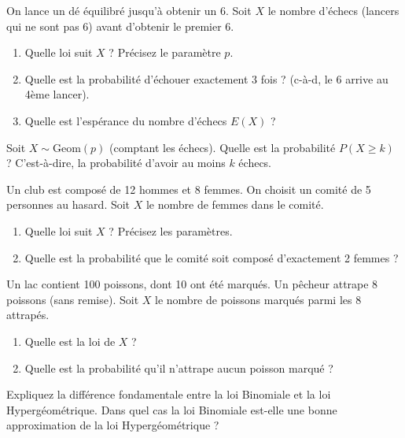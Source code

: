 
\begin{exercicebox}
On lance un dé équilibré jusqu'à obtenir un 6. Soit $X$ le nombre d'échecs (lancers qui ne sont pas 6) avant d'obtenir le premier 6.
\begin{enumerate}
    \item Quelle loi suit $X$ ? Précisez le paramètre $p$.
    \item Quelle est la probabilité d'échouer exactement 3 fois ? (c-à-d, le 6 arrive au 4ème lancer).
    \item Quelle est l'espérance du nombre d'échecs $E(X)$ ?
\end{enumerate}
\end{exercicebox}

\begin{exercicebox}
Soit $X \sim \text{Geom}(p)$ (comptant les échecs).
Quelle est la probabilité $P(X \ge k)$ ? C'est-à-dire, la probabilité d'avoir au moins $k$ échecs.
\end{exercicebox}

\begin{exercicebox}
Un club est composé de 12 hommes et 8 femmes. On choisit un comité de 5 personnes au hasard. Soit $X$ le nombre de femmes dans le comité.
\begin{enumerate}
    \item Quelle loi suit $X$ ? Précisez les paramètres.
    \item Quelle est la probabilité que le comité soit composé d'exactement 2 femmes ?
\end{enumerate}
\end{exercicebox}

\begin{exercicebox}
Un lac contient 100 poissons, dont 10 ont été marqués. Un pêcheur attrape 8 poissons (sans remise). Soit $X$ le nombre de poissons marqués parmi les 8 attrapés.
\begin{enumerate}
    \item Quelle est la loi de $X$ ?
    \item Quelle est la probabilité qu'il n'attrape aucun poisson marqué ?
\end{enumerate}
\end{exercicebox}

\begin{exercicebox}
Expliquez la différence fondamentale entre la loi Binomiale et la loi Hypergéométrique. Dans quel cas la loi Binomiale est-elle une bonne approximation de la loi Hypergéométrique ?
\end{exercicebox}

